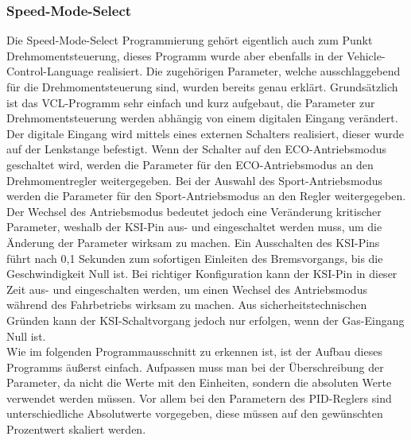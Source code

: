 \subsubsection{Speed-Mode-Select}
Die Speed-Mode-Select Programmierung gehört eigentlich auch zum Punkt Drehmomentsteuerung, dieses Programm wurde aber ebenfalls in der Vehicle-Control-Language realisiert. Die zugehörigen Parameter, welche ausschlaggebend für die Drehmomentsteuerung sind, wurden bereits genau erklärt. Grundsätzlich ist das VCL-Programm sehr einfach und kurz aufgebaut, die Parameter zur Drehmomentsteuerung werden abhängig von einem digitalen Eingang verändert. Der digitale Eingang wird mittels eines externen Schalters realisiert, dieser wurde auf der Lenkstange befestigt. Wenn der Schalter auf den ECO-Antriebsmodus geschaltet wird, werden die Parameter für den ECO-Antriebsmodus an den Drehmomentregler weitergegeben. Bei der Auswahl des Sport-Antriebsmodus werden die Parameter für den Sport-Antriebsmodus an den Regler weitergegeben. Der Wechsel des Antriebsmodus bedeutet jedoch eine Veränderung kritischer Parameter, weshalb der KSI-Pin aus- und eingeschaltet werden muss, um die Änderung der Parameter wirksam zu machen. Ein Ausschalten des KSI-Pins führt nach 0,1 Sekunden zum sofortigen Einleiten des Bremsvorgangs, bis die Geschwindigkeit Null ist. Bei richtiger Konfiguration kann der KSI-Pin in dieser Zeit aus- und eingeschalten werden, um einen Wechsel des Antriebsmodus während des Fahrbetriebs wirksam zu machen. Aus sicherheitstechnischen Gründen kann der KSI-Schaltvorgang jedoch nur erfolgen, wenn der Gas-Eingang Null ist.\\ 
\vspace{5mm}
Wie im folgenden Programmausschnitt zu erkennen ist, ist der Aufbau dieses Programms äußerst einfach. Aufpassen muss man bei der Überschreibung der Parameter, da nicht die Werte mit den Einheiten, sondern die absoluten Werte verwendet werden müssen. Vor allem bei den Parametern des PID-Reglers sind unterschiedliche Absolutwerte vorgegeben, diese müssen auf den gewünschten Prozentwert skaliert werden.
\vspace{2mm}
